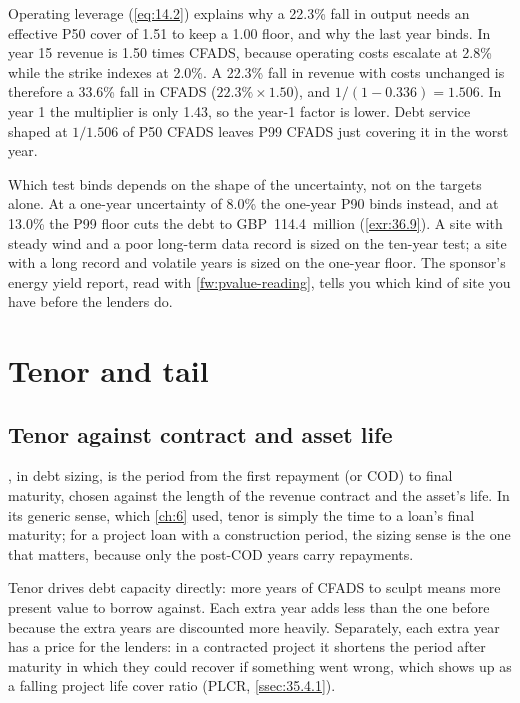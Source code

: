 Operating leverage (\cref{eq:14.2}) explains why a 22.3\% fall in output needs an effective P50 cover of 1.51\x{} to keep a 1.00\x{} floor, and why the last year binds. In year 15 revenue is 1.50 times CFADS, because operating costs escalate at 2.8\% while the strike indexes at 2.0\%. A 22.3\% fall in revenue with costs unchanged is therefore a 33.6\% fall in CFADS ($22.3\% \times 1.50$), and $1/(1 - 0.336) = 1.506$. In year 1 the multiplier is only 1.43, so the year-1 factor is lower. Debt service shaped at $1/1.506$ of P50 CFADS leaves P99 CFADS just covering it in the worst year.

Which test binds depends on the shape of the uncertainty, not on the targets alone. At a one-year uncertainty of 8.0\% the one-year P90 binds instead, and at 13.0\% the P99 floor cuts the debt to GBP~114.4~million (\cref{exr:36.9}). A site with steady wind and a poor long-term data record is sized on the ten-year test; a site with a long record and volatile years is sized on the one-year floor. The sponsor's energy yield report, read with \cref{fw:pvalue-reading}, tells you which kind of site you have before the lenders do.

\section{Tenor and tail}\label{sec:36.5}

\subsection{Tenor against contract and asset life}\label{ssec:36.5.1}

, in debt sizing, is the period from the first repayment (or COD) to final maturity, chosen against the length of the revenue contract and the asset's life. In its generic sense, which \cref{ch:6} used, tenor is simply the time to a loan's final maturity; for a project loan with a construction period, the sizing sense is the one that matters, because only the post-COD years carry repayments.

Tenor drives debt capacity directly: more years of CFADS to sculpt means more present value to borrow against. Each extra year adds less than the one before because the extra years are discounted more heavily. Separately, each extra year has a price for the lenders: in a contracted project it shortens the period after maturity in which they could recover if something went wrong, which shows up as a falling project life cover ratio (PLCR, \cref{ssec:35.4.1}).

